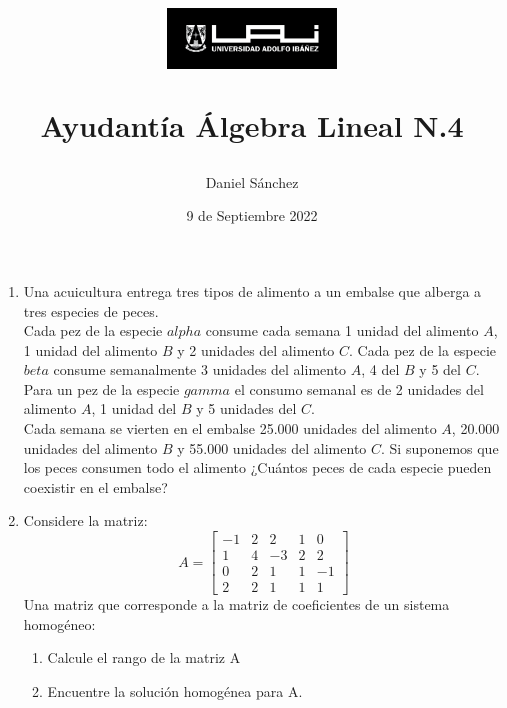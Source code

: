 \documentclass[12pt]{article}
\begin{document}
\title{
    \begin{figure}[ht]
        \centering
        \includegraphics[width = 0.4\textwidth, ]{../../logo-uai.jpg}\\
    \end{figure}
    Ayudant\'ia \'Algebra Lineal N.4}
\date{9 de Septiembre 2022}
\author{Daniel S\'anchez}
\maketitle

\begin{enumerate}

    \item Una acuicultura entrega tres tipos de alimento a un embalse que alberga
          a tres especies de peces.\\
          Cada pez de la especie $alpha$ consume cada semana 1 unidad del alimento $A$, 1 unidad
          del alimento $B$ y 2 unidades del alimento $C$. Cada pez de la especie $beta$ consume semanalmente
          3 unidades del alimento $A$, 4 del $B$ y 5 del $C$. Para un pez de la especie $gamma$ el consumo
          semanal es de 2 unidades del alimento $A$, 1 unidad del $B$ y 5 unidades del $C$.\\
          Cada semana se vierten en el embalse 25.000 unidades del alimento $A$, 20.000 unidades del alimento
          $B$ y 55.000 unidades del alimento $C$. Si suponemos que los peces consumen todo el alimento ¿Cu\'antos peces
          de cada especie pueden coexistir en el embalse?
          
    \item Considere la matriz:
          $$A=\begin{bmatrix}
                  -1 & 2 & 2  & 1 & 0  \\
                  1  & 4 & -3 & 2 & 2  \\
                  0  & 2 & 1  & 1 & -1 \\
                  2  & 2 & 1  & 1 & 1
              \end{bmatrix}$$
          Una matriz que corresponde a la matriz de coeficientes de un sistema homog\'eneo:
          \begin{enumerate}
              \item Calcule el rango de la matriz A
              \item Encuentre la soluci\'on homog\'enea para A.
          \end{enumerate}
          

\end{enumerate}
\end{document}
